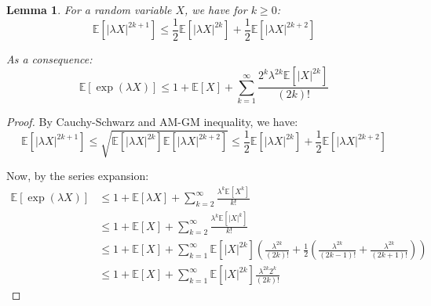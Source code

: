 \documentclass{article}
\newtheorem{lemma}{Lemma}[subsection]
\theoremstyle{remark}
\newcommand{\Exp}{\mathbb{E}}
\begin{document}
\begin{lemma}
\label{lem:odd-even-moments}
For a random variable \(X\), we have for \(k \geq 0\):
\begin{equation*}
\Exp[|\lambda X|^{2k + 1}] \leq \frac{1}{2}\Exp[|\lambda X|^{2k}] + \frac{1}{2}\Exp[|\lambda X|^{2k + 2}]
\end{equation*}

As a consequence:
\begin{equation*}
\Exp[\exp(\lambda X)] \leq 1 + \Exp[X] + \sum_{k=1}^{\infty}\frac{2^{k}\lambda^{2k}\Exp[|X|^{2k}]}{(2k)!}
\end{equation*}
\end{lemma}

\begin{proof}
By Cauchy-Schwarz and AM-GM inequality, we have:
\begin{equation*}
\Exp[|\lambda X|^{2k + 1}] \leq \sqrt{\Exp[|\lambda X|^{2k}] \Exp[|\lambda X|^{2k + 2}]} \leq \frac{1}{2}\Exp[|\lambda X|^{2k}] + \frac{1}{2}\Exp[|\lambda X|^{2k + 2}]
\end{equation*}

Now, by the series expansion:
\begin{align*}
\Exp[\exp(\lambda X)] &\leq 1 + \Exp[\lambda X] + \sum_{k=2}^{\infty} \frac{\lambda^{k} \Exp[X^{k}]}{k!} \\
&\leq 1 + \Exp[X] + \sum_{k=2}^{\infty} \frac{\lambda^{k} \Exp[|X|^{k}]}{k!} \\
&\leq 1 + \Exp[X] + \sum_{k=1}^{\infty} \Exp[|X|^{2k}]\left(\frac{\lambda^{2k}}{(2k)!} + \frac{1}{2}\left(\frac{\lambda^{2k}}{(2k - 1)!} + \frac{\lambda^{2k}}{(2k + 1)!}\right)\right) \\
&\leq 1 + \Exp[X] + \sum_{k=1}^{\infty} \Exp[|X|^{2k}]\frac{\lambda^{2k}2^{k}}{(2k)!}
\end{align*}
\end{proof}

\newpage


\end{document}
